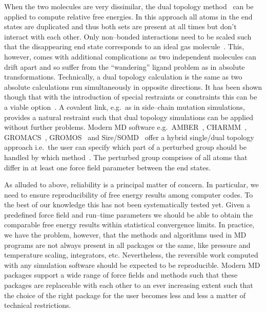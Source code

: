 \documentclass[journal=jctcce,manuscript=article]{achemso}
\begin{document}
When the two molecules are very dissimilar, the dual topology
method~\cite{doi:10.1021/j100056a020, doi:10.1021/jp981628n} can be
applied to compute relative free energies.  In this approach all atoms
in the end states are duplicated and thus both sets are present at all
times but don't interact with each other.  Only non--bonded
interactions need to be scaled such that the disappearing end state
corresponds to an ideal gas molecule~\cite{doi:10.1021/jp981628n}.
This, however, comes with additional complications as two independent
molecules can drift apart and so suffer from the ``wandering'' ligand
problem as in absolute transformations\cite{GILSON19971047,
  doi:10.1021/jp0217839, deng_computations_2009}.  Technically, a dual
topology calculation is the same as two absolute calculations run
simultaneously in opposite directions.  It has been shown though that
with the introduction of special restraints or constraints this can be
a viable option~\cite{doi:10.1021/ct700081t, rocklin_separated_2013}.
A covalent link, e.g.\ as in side--chain mutation simulations,
provides a natural restraint such that dual topology simulations can
be applied without further problems.  Modern MD software e.g.\
AMBER~\cite{case_amber_2005}, CHARMM~\cite{JCC:JCC21287},
GROMACS~\cite{Abraham201519}, GROMOS~\cite{doi:10.1021/jp984217f} and
Sire/SOMD~\cite{Sire-2016, doi:10.1021/ct300857j} offer a hybrid
single/dual topology approach i.e.\ the user can specify which part of
a perturbed group should be handled by which
method~\cite{doi:10.1021/jp994193s}.  The perturbed group comprises of
all atoms that differ in at least one force field parameter between
the end states.

As alluded to above, reliability is a principal matter of concern.  In
particular, we need to ensure reproducibility of free energy results
among computer codes.  To the best of our knowledge this has not been
systematically tested yet.  Given a predefined force field and
run--time parameters we should be able to obtain the comparable free
energy results within statistical convergence limits.  In practice, we
have the problem, however, that the methods and algorithms used in MD
programs are not always present in all packages or the same, like
pressure and temperature scaling, integrators, etc.  Nevertheless, the
reversible work computed with any simulation software should be
expected to be reproducible.  Modern MD packages support a wide range
of force fields and methods such that these packages are replaceable
with each other to an ever increasing extent such that the choice of
the right package for the user becomes less and less a matter of
technical restrictions.
\end{document}
